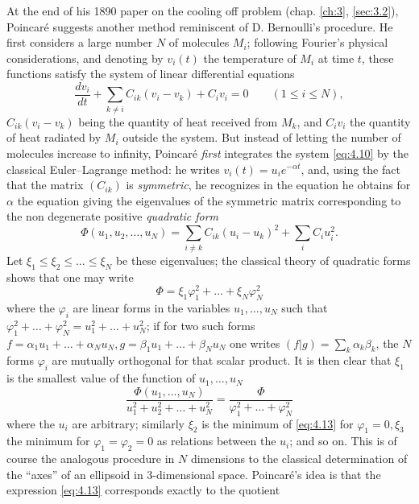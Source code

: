 \documentclass[12pt,a4paper,leqno,twoside]{extbook}
\begin{document}
At the end of his 1890 paper on the cooling off problem (chap. \ref{ch:3}, \ref{sec:3.2}), Poincaré suggests another method reminiscent of D. Bernoulli's procedure. He first considers a large number \(N\) of molecules \(M_i\); following Fourier's physical considerations, and denoting by \(v_i(t)\) the temperature of \(M_i\) at time \(t\), these functions satisfy the system of linear differential equations
\begin{equation}
    \label{eq:4.10}
    \frac{dv_i}{dt} + \sum_{k \neq i} C_{ik} (v_i - v_k) + C_i v_i = 0 \qquad (1 \leq i \leq N),
\end{equation}
\(C_{ik} (v_i - v_k)\) being the quantity of heat received from \(M_k\), and \(C_i v_i\) the quantity of heat radiated by \(M_i\) outside the system. But instead of letting the number of molecules increase to infinity, Poincaré \emph{first} integrates the system \eqref{eq:4.10} by the classical Euler--Lagrange method: he writes \(v_i(t) = u_i e^{-\alpha t}\), and, using the fact that the matrix \((C_{ik})\) is \emph{symmetric}, he recognizes in the equation he obtains for \(\alpha\) the equation giving the eigenvalues of the symmetric matrix corresponding to the non degenerate positive \emph{quadratic form}
\begin{equation}
    \label{eq:4.11}
    \Phi(u_1, u_2, \ldots, u_N) = \sum_{i \neq k} C_{ik} (u_i - u_k)^2 + \sum_i C_i u_i^2.
\end{equation}
Let \(\xi_1 \leq \xi_2 \leq \ldots \leq \xi_N\) be these eigenvalues; the classical theory of quadratic forms shows that one may write
\begin{equation}
    \label{eq:4.12}
    \Phi = \xi_1 \varphi_1^2 + \ldots + \xi_N \varphi_N^2
\end{equation}
where the \(\varphi_i\) are linear forms in the variables \(u_1, \ldots, u_N\) such that \(\varphi_1^2 + \ldots + \varphi_N^2 = u_1^2 + \ldots + u_N^2\); if for two such forms \(f = \alpha_1 u_1 + \ldots + \alpha_N u_N, g = \beta_1 u_1 + \ldots + \beta_N u_N\) one writes \((f|g) = \sum\limits_k \alpha_k \beta_k\), the \(N\) forms \(\varphi_i\) are mutually orthogonal for that scalar product. It is then clear that \(\xi_1\) is the smallest value of the function of \(u_1, \ldots, u_N\)
\begin{equation}
    \label{eq:4.13}
    \frac{\Phi(u_1, \ldots, u_N)}{u_1^2 + u_2^2 + \ldots + u_N^2} = \frac{\Phi}{\varphi_1^2 + \ldots + \varphi_N^2}
\end{equation}
where the \(u_i\) are arbitrary; similarly \(\xi_2\) is the minimum of \eqref{eq:4.13} for \(\varphi_1 = 0, \xi_3\) the minimum for \(\varphi_1 = \varphi_2 = 0\) as relations between the \(u_i\); and so on. This is of course the analogous procedure in \(N\) dimensions to the classical determination of the ``axes'' of an ellipsoid in 3-dimensional space. Poincaré's idea is that the expression \eqref{eq:4.13} corresponds exactly to the quotient
\end{document}

